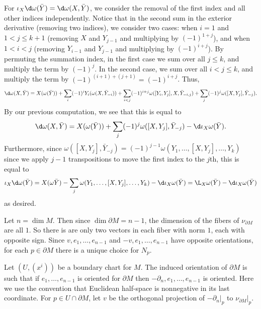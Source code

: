     For $\iota_X\d\omega(\bar Y)=\d\omega(X,\bar Y)$, we consider the removal of the first index and all other indices independently.
    Notice that in the second sum in the exterior derivative (removing two indices), we consider two cases: when $i=1$ and $1<j\leq k+1$ (removing $X$ and $Y_{j-1}$ and
    multiplying by $(-1)^{1+j}$), and when $1<i<j$ (removing $Y_{i-1}$ and $Y_{j-1}$ and multiplying by $(-1)^{i+j}$).
    By permuting the summation index, in the first case we sum over all $j\leq k$, and multiply the term by $(-1)^j$.
    In the second case, we sum over all $i<j\leq k$, and multiply the term by $(-1)^{(i+1)+(j+1)}=(-1)^{i+j}$.
    Thus,
    $$ \d\omega(X,\bar Y) = X(\omega(\bar Y)) + \sum_i(-1)^iY_i(\omega(X,\bar Y_{-i})) + \sum_{i<j}(-1)^{i+j}\omega([Y_i,Y_j],X,\bar Y_{-i,j}) + \sum_j(-1)^j\omega([X,Y_j],\bar Y_{-j}) . $$
    By our previous computation, we see that this is equal to
    $$ \d\omega(X,\bar Y) = X(\omega(\bar Y)) + \sum_j(-1)^j\omega([X,Y_j],\bar Y_{-j}) - \d\iota_X\omega(\bar Y) . $$
    Furthermore, since $\omega([X,Y_j],\bar Y_{-j})=(-1)^{j-1}\omega(Y_1,\dots,[X,Y_j],\dots,Y_k)$ since we apply $j-1$ transpositions to move the first index to the $j$th, this is equal to
    $$ \iota_X\d\omega(\bar Y) = X(\omega\bar Y) - \sum_j\omega(Y_1,\dots,[X,Y_j],\dots,Y_k) - \d\iota_X\omega(\bar Y) = \L_X\omega(\bar Y) - \d\iota_X\omega(\bar Y) $$
    as desired.

    \item Let $n=\dim M$.
    Then since $\dim\partial M=n-1$, the dimension of the fibers of $\nu_{\partial M}$ are all $1$.
    So there is are only two vectors in each fiber with norm $1$, each with opposite sign.
    Since $v,e_1,\dots,e_{n-1}$ and $-v,e_1,\dots,e_{n-1}$ have opposite orientations, for each $p\in\partial M$ there is a unique choice for $N_p$.

    Let $(U,(x^i))$ be a boundary chart for $M$.
    The induced orientation of $\partial M$ is such that if $e_1,\dots,e_{n-1}$ is oriented for $\partial M$ then $-\partial_n,e_1,\dots,e_{n-1}$ is oriented.
    Here we use the convention that Euclidean half-space is nonnegative in its last coordinate.
    For $p\in U\cap\partial M$, let $v$ be the orthogonal projection of $-\partial_n|_p$ to $\nu_{\partial M}|_p$.

